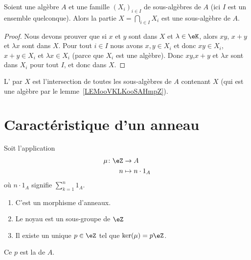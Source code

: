 \begin{lemma}   \label{LEMooVKLKooSAHmpZ}
    Soient une algèbre \( A\) et une famille \( (X_i)_{i\in I}\) de sous-algèbres de \( A\) (ici \( I\) est un ensemble quelconque). Alors la partie \( X=\bigcap_{i\in I}X_i\) est une sous-algèbre de \( A\).
\end{lemma}

\begin{proof}
    Nous devons prouver que si \( x\) et \( y\) sont dans \( X\) et \( \lambda\in \eK\), alors \( xy\), \( x+y\) et \( \lambda x\) sont dans \( X\). Pour tout \( i\in I\) nous avons \( x,y\in X_i\) et donc \( xy\in X_i\), \( x+y\in X_i\) et \( \lambda x\in X_i\) (parce que \( X_i\) est une algèbre). Donc \( xy\),\( x+y\) et \( \lambda x\) sont dans \( X_i\) pour tout \( I\), et donc dans \( X\).
\end{proof}

\begin{definition}\label{DefkAXaWY}
    L' par \( X\) est l'intersection de toutes les sous-algèbres de \( A\) contenant \( X\) (qui est une algèbre par le lemme~\ref{LEMooVKLKooSAHmpZ}).
\end{definition}



\section{Caractéristique d'un anneau}

\begin{lemmaDef}        \label{LEMDEFooVEWZooUrPaDw}
    Soit l'application
    \begin{equation}
        \begin{aligned}
            \mu\colon \eZ&\to A \\
            n&\mapsto n\cdot 1_A
        \end{aligned}
    \end{equation}
    où \( n\cdot 1_A\) signifie \( \sum_{k=1}^n1_A\).
    \begin{enumerate}
        \item
            C'est un morphisme d'anneaux.
        \item
            Le noyau est un sous-groupe de \( \eZ\)
        \item
            Il existe un unique \( p\in \eZ\) tel que \( \ker(\mu)=p\eZ\).
    \end{enumerate}
    Ce \( p\) est la  de \( A\).
\end{lemmaDef}

